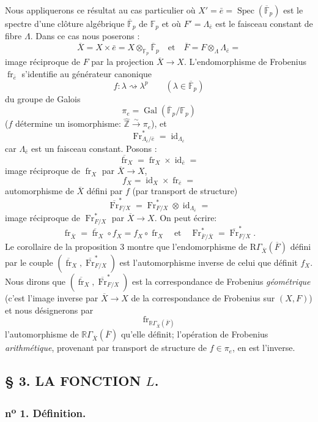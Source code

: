 \documentclass[11pt]{article}
\DeclareMathOperator{\Spec}{Spec}
\newcommand{\R}{\mathbb{R}}\newcommand{\RHomCore}{\mathbb{R}\mathrm{Hom}}
\providecommand{\Gal}{\operatorname{Gal}}
\providecommand{\RGamma}{\R\Gamma}
\providecommand{\id}{\operatorname{id}}
\providecommand{\id}{\operatorname{id}}
\providecommand{\id}{\operatorname{id}}
\providecommand{\RGamma}{\R\Gamma}
\providecommand{\R}{\mathrm R}
\providecommand{\id}{\operatorname{id}}
\providecommand{\Spec}{\operatorname{Spec}}
\providecommand{\Spec}{\operatorname{Spec}}
\providecommand{\id}{\operatorname{id}}
\providecommand{\Spec}{\operatorname{Spec}}
\providecommand{\fr}{\operatorname{fr}}
\providecommand{\Fr}{\operatorname{Fr}}
\providecommand{\Fr}{\operatorname{Fr}}
\providecommand{\fr}{\operatorname{fr}}
\providecommand{\Spec}{\operatorname{Spec}}
\providecommand{\id}{\operatorname{id}}
\providecommand{\RGamma}{\R\Gamma}
\providecommand{\Gal}{\operatorname{Gal}}
\begin{document}
Nous appliquerons ce résultat au cas particulier où $X'=\bar e=\Spec(\overline{\mathbb F}_p)$ est le spectre d'une clôture algébrique $\overline{\mathbb F}_p$ de $\mathbb F_p$ et où $F'=\Lambda_{\bar e}$ est le faisceau constant de fibre $\Lambda$. Dans ce cas nous poserons :
\[
\overline X=X\times\bar e=X\otimes_{\mathbb F_p}\overline{\mathbb F}_p\quad\text{et}\quad
\overline F=F\otimes_\Lambda\Lambda_{\bar e}=
\]
image réciproque de $F$ par la projection $\overline X\to X$. L'endomorphisme de Frobenius $\fr_{\bar e}$ s'identifie au générateur canonique
\[
f:\lambda\rightsquigarrow\lambda^p\qquad(\lambda\in\overline{\mathbb F}_p)
\]
du groupe de Galois
\[
\pi_e=\Gal(\overline{\mathbb F}_p/\mathbb F_p)
\]
($f$ détermine un isomorphisme: $\widehat{\mathbb Z}\xrightarrow{\sim}\pi_e$), et
\[
\Fr^*_{\Lambda_{\bar e}/\bar e}=\id_{\Lambda_{\bar e}}
\]
car $\Lambda_{\bar e}$ est un faisceau constant. Posons :
\[
\overline{\fr}_X=\fr_X\times\id_{\bar e}=
\]
image réciproque de $\fr_X$ par $\overline X\to X$,
\[
f_X=\id_X\times\fr_{\bar e}=
\]
automorphisme de $\overline X$ défini par $f$ (par transport de structure)
\[
\overline{\Fr}^*_{F/X}=\Fr^*_{F/X}\otimes\id_{\Lambda_{\bar e}}=
\]
image réciproque de $\Fr^*_{F/X}$ par $\overline X\to X$. On peut écrire:
\[
\fr_{\overline X}=\overline{\fr}_X\circ f_X=f_X\circ\fr_X\quad\text{et}\quad
\Fr^*_{\overline F/\overline X}=\overline{\Fr}^*_{F/X}.
\]
Le corollaire de la proposition 3 montre que l'endomorphisme de $\mathrm{R}\Gamma_{\overline X}(\overline F)$ défini par le couple $(\overline{\fr}_X,\overline{\Fr}^*_{F/X})$ est l'automorphisme inverse de celui que définit $f_X$. Nous dirons que $(\overline{\fr}_X,\overline{\Fr}^*_{F/X})$ est la correspondance de Frobenius \emph{géométrique} (c'est l'image inverse par $\overline X\to X$ de la correspondance de Frobenius sur $(X,F)$) et nous désignerons par
\[
\fr_{\RGamma_{\overline X}(\overline F)}
\]
l'automorphisme de $\RGamma_{\overline X}(\overline F)$ qu'elle définit; l'opération de Frobenius \emph{arithmétique}, provenant par transport de structure de $f\in\pi_e$, en est l'inverse.

\subsection*{§ 3. LA FONCTION $L$.}

\subsubsection*{n\textsuperscript{o} 1. Définition.}
\end{document}
